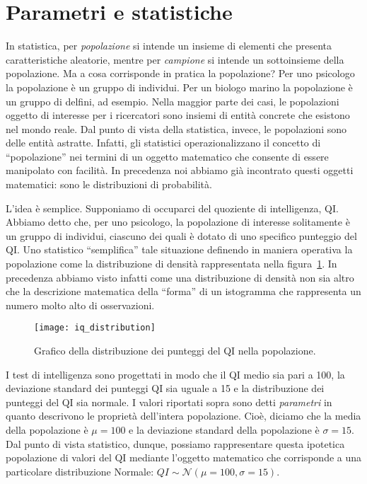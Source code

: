 \section{Parametri e statistiche}
\label{sec:pars_and_sample_stats}

In statistica, per \emph{popolazione} si intende un insieme di elementi che presenta caratteristiche aleatorie, mentre per \emph{campione} si intende un sottoinsieme della popolazione.
Ma a cosa corrisponde in pratica la popolazione?
Per uno psicologo la popolazione è un gruppo di individui.
Per un biologo marino la popolazione è un gruppo di delfini, ad esempio.
Nella maggior parte dei casi, le popolazioni oggetto di interesse per i ricercatori sono insiemi di entità concrete che esistono nel mondo reale. 
Dal punto di vista della statistica, invece, le popolazioni sono delle entità astratte. 
Infatti, gli statistici operazionalizzano il concetto di \enquote{popolazione} nei termini di un oggetto matematico che consente di essere manipolato con facilità.
In precedenza noi abbiamo già incontrato questi oggetti matematici: sono le distribuzioni di probabilità.

L'idea è semplice. 
Supponiamo di occuparci del quoziente di intelligenza, QI. 
Abbiamo detto che, per uno psicologo, la popolazione di interesse solitamente è un gruppo di individui, ciascuno dei quali è dotato di uno specifico punteggio del QI. 
Uno statistico \enquote{semplifica} tale situazione definendo in maniera operativa la popolazione come la distribuzione di densità rappresentata nella figura~\ref{fig:qi_distribution}. 
In precedenza abbiamo visto infatti come una distribuzione di densità non sia altro che la descrizione matematica della \enquote{forma} di un istogramma che rappresenta un numero molto alto di osservazioni.

\begin{figure}[h!]
\centering
\texttt{[image: iq\_distribution]}
\caption{Grafico della distribuzione dei punteggi del QI nella popolazione.}
\label{fig:qi_distribution}
\end{figure}

I test di intelligenza sono progettati in modo che il QI medio sia pari a 100, la deviazione standard dei punteggi QI sia uguale a 15 e la distribuzione dei punteggi del QI sia normale. 
I valori riportati sopra sono detti \emph{parametri} in quanto descrivono le proprietà dell'intera popolazione. 
Cioè, diciamo che la media della popolazione è $\mu = 100$ e la deviazione standard della popolazione è $\sigma = 15$.
Dal punto di vista statistico, dunque, possiamo rappresentare questa ipotetica popolazione di valori del QI mediante l'oggetto matematico che corrisponde a una particolare distribuzione Normale: $QI \sim \mathcal{N}(\mu = 100, \sigma = 15).$

